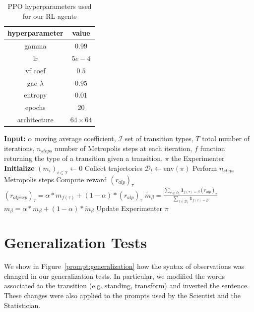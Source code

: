\documentclass{article}
\begin{document}
\begin{table}[hbt]
    \centering
    \begin{tabular}{|c|c|}
        \hline
        \textbf{hyperparameter} & \textbf{value} \\
        \hline
        gamma & $0.99$ \\
        lr & $5e-4$ \\
        vf coef & $0.5$\\
        gae $\lambda$ & $0.95$\\
        entropy & $0.01$ \\
        epochs & 20 \\
        architecture & $64\times64$\\
        \hline
    \end{tabular}
    \caption{PPO hyperparameters used for our RL agents}
    \label{tab:hyperparameters RL}
\end{table}

\begin{algorithm}
\caption{RL-ALPEXP}
\begin{algorithmic}[1]
\State \textbf{Input:} $\alpha$ moving average coefficient, $\mathcal{I}$ set of transition types, $T$ total number of iterations, $n_{steps}$ number of Metropolis steps at each iteration, $f$ function returning the type of a transition given a transition, $\pi$ the Experimenter
\State \textbf{Initialize} $(m_i)_{i \in \mathcal{I}} \gets 0$ 
    \State Collect trajectories $\mathcal{D}_t \leftarrow$env$(\pi)$
    \State Perform $n_{steps}$ Metropolis steps
        \State Compute reward $(r_{alp})_\tau$  %
        \State $(r_{alpexp})_\tau=\alpha*m_{f(\tau)}+(1-\alpha)*(r_{alp})_\tau$
    \EndFor
        \State $\tilde{m}_\beta = \frac{\sum\limits_{\tau \in \mathcal{D}_t}  \mathbf{1}_{f(\tau)=\beta}(r_{alp})_\tau}{\sum\limits_{\tau \in \mathcal{D}_t}  \mathbf{1}_{f(\tau)=\beta}}$
        \State $m_\beta=\alpha*m_\beta + (1-\alpha)*\tilde{m}_\beta$
    \EndFor
    \State Update Experimenter $\pi$ 
\EndFor
\end{algorithmic}
\label{alg:worldllm-rl-alpexp}
\end{algorithm}


\section{Generalization Tests}
We show in Figure~\ref{prompt:generalization} how the syntax of observations was changed in our generalization tests. In particular, we modified the words associated to the transition (e.g. standing, transform) and inverted the sentence. These changes were also applied to the prompts used by the Scientist and the Statistician.
\end{document}
